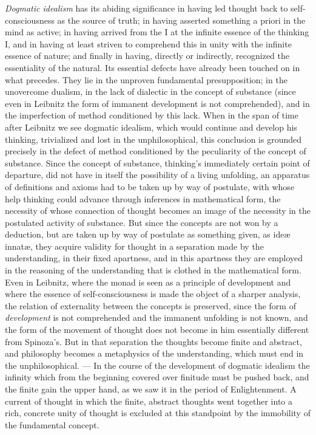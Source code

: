 \emph{Dogmatic idealism} has its abiding significance in having led thought back to
self-consciousness as the source of truth; in having asserted something a priori in the mind as
active; in having arrived from the I at the infinite essence of the thinking I, and in having at
least striven to comprehend this in unity with the infinite essence of nature; and finally in
having, directly or indirectly, recognized the essentiality of the natural. Its essential defects
have already been touched on in what precedes. They lie in the unproven fundamental presupposition;
in the unovercome dualism, in the lack of dialectic in the concept of substance (since even in
Leibnitz the form of immanent development is not comprehended), and in the imperfection
of method conditioned by this lack. When in the span of time after Leibnitz we see dogmatic
idealism, which would continue and develop his thinking, trivialized and lost in the
unphilosophical, this conclusion is grounded precisely in the defect of method conditioned by the
peculiarity of the concept of substance. Since the concept of substance, thinking's immediately
certain point of departure, did not have in itself the possibility of a living unfolding, an
apparatus of definitions and axioms had to be taken up by way of postulate, with whose help thinking
could advance through inferences in mathematical form, the necessity of whose connection of thought
becomes an image of the necessity in the postulated activity of substance. But since the concepts
are not won by a deduction, but are taken up by way of postulate as something given, as ideæ
innatæ, they acquire validity for thought in a separation made by the understanding, in their fixed
apartness, and in this apartness they are employed in the reasoning of the understanding that is
clothed in the mathematical form. Even in Leibnitz, where the monad is seen as a principle of
development and where the essence of self-consciousness is made the object of a sharper analysis,
the relation of externality between the concepts is preserved, since the form of
\emph{development} is not comprehended and the immanent unfolding is not known, and the form of the
movement of thought does not become in him essentially different from Spinoza's. But in that
separation the thoughts become finite and abstract, and philosophy becomes a metaphysics of the
understanding, which must end in the unphilosophical. --- In the course of the development of
dogmatic idealism the infinity which from the beginning covered over finitude must be pushed back,
and the finite gain the upper hand, as we saw it in the period of Enlightenment. A current of
thought in which the finite, abstract thoughts went together into a rich, concrete unity of thought
is excluded at this standpoint by the immobility of the fundamental concept.


